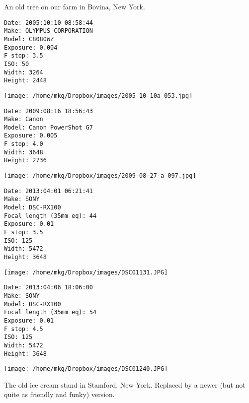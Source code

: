 \clearpage

\noindent An old tree on our farm in Bovina, New York.

\begin{lstlisting}
Date: 2005:10:10 08:58:44
Make: OLYMPUS CORPORATION
Model: C8080WZ
Exposure: 0.004
F stop: 3.5
ISO: 50
Width: 3264
Height: 2448

\end{lstlisting}

\clearpage
\texttt{[image: /home/mkg/Dropbox/images/2005-10-10a 053.jpg]}

\clearpage

\noindent 

\begin{lstlisting}
Date: 2009:08:16 18:56:43
Make: Canon
Model: Canon PowerShot G7
Exposure: 0.005
F stop: 4.0
Width: 3648
Height: 2736

\end{lstlisting}

\clearpage
\texttt{[image: /home/mkg/Dropbox/images/2009-08-27-a 097.jpg]}

\clearpage

\noindent 

\begin{lstlisting}
Date: 2013:04:01 06:21:41
Make: SONY
Model: DSC-RX100
Focal length (35mm eq): 44
Exposure: 0.01
F stop: 3.5
ISO: 125
Width: 5472
Height: 3648

\end{lstlisting}

\clearpage
\texttt{[image: /home/mkg/Dropbox/images/DSC01131.JPG]}

\clearpage

\noindent 

\begin{lstlisting}
Date: 2013:04:06 18:06:00
Make: SONY
Model: DSC-RX100
Focal length (35mm eq): 54
Exposure: 0.01
F stop: 4.5
ISO: 125
Width: 5472
Height: 3648

\end{lstlisting}

\clearpage
\texttt{[image: /home/mkg/Dropbox/images/DSC01240.JPG]}

\clearpage

\noindent The old ice cream stand in Stamford, New York. Replaced by a newer (but not quite as friendly and funky) version.

